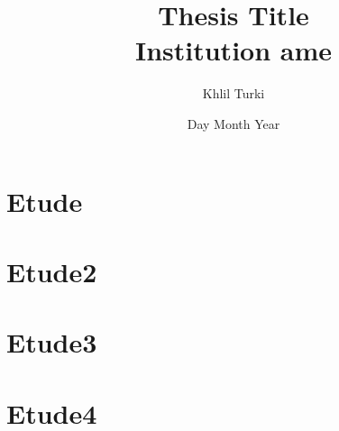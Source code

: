 \documentclass[12pt]{report}
\title{
Thesis Title\\
\large{Institution ame}\\
}
\author{Khlil Turki}
\date{Day Month Year}
\begin{document}
    

    \tableofcontents

    \chapter{Etude}
    \label{ch:chapter1}
    

    \chapter{Etude2}
    \label{ch:chapter2}
    

    \chapter{Etude3}
    \label{ch:chapter3}
    

    \chapter{Etude4}
    \label{ch:chapter4}
    
\end{document}
